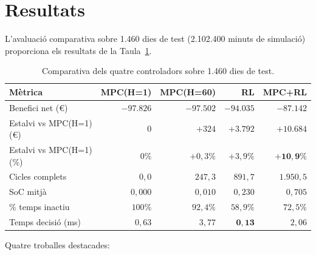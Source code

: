 \documentclass[a4paper,12pt]{ThesisStyle}
\begin{document}
\section*{Resultats}

L'avaluació comparativa sobre 1.460 dies de test (2.102.400 minuts de simulació) proporciona
els resultats de la Taula~\ref{taula:resum_resultats}.

\begin{table}[h]
\centering
\small
\begin{tabular}{@{}lrrrr@{}}
\toprule
\textbf{Mètrica} & \textbf{MPC(H=1)} & \textbf{MPC(H=60)} & \textbf{RL} & \textbf{MPC+RL} \\
\midrule
Benefici net (€)          & $-97.826$ & $-97.502$ & $-94.035$ & $\mathbf{-87.142}$ \\
Estalvi vs MPC(H=1) (€)   & $0$       & $+324$    & $+3.792$  & $\mathbf{+10.684}$ \\
Estalvi vs MPC(H=1) (\%)  & $0\%$     & $+0{,}3\%$& $+3{,}9\%$& $\mathbf{+10{,}9\%}$ \\
Cicles complets           & $0{,}0$   & $247{,}3$ & $891{,}7$ & $1.950{,}5$ \\
SoC mitjà                 & $0{,}000$ & $0{,}010$ & $0{,}230$ & $0{,}705$ \\
\% temps inactiu          & $100\%$   & $92{,}4\%$& $58{,}9\%$& $72{,}5\%$ \\
Temps decisió (ms)        & $0{,}63$  & $3{,}77$  & $\mathbf{0{,}13}$ & $2{,}06$ \\
\bottomrule
\end{tabular}
\caption{Comparativa dels quatre controladors sobre 1.460 dies de test.}
\label{taula:resum_resultats}
\end{table}

Quatre troballes destacades:
\end{document}
